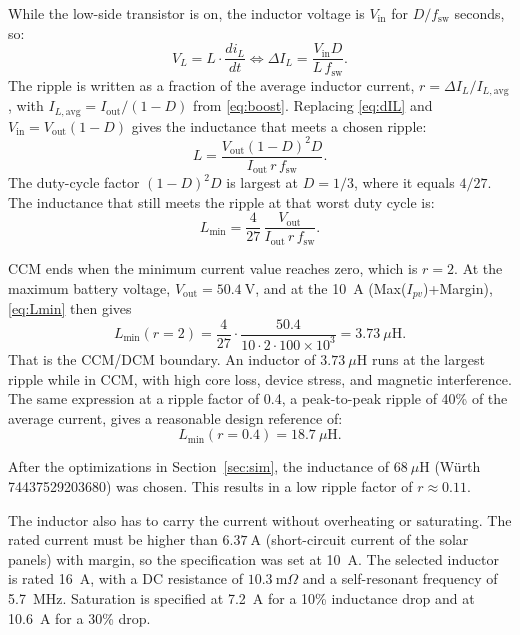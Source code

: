 \documentclass[conference]{IEEEtran}
\begin{document}
    While the low-side transistor is on, the inductor voltage is $V_{\mathrm{in}}$ for $D/f_{\mathrm{sw}}$ seconds, so:
    \begin{equation}
         V_L = L \cdot \frac{di_L}{dt} \Leftrightarrow \Delta I_L = \frac{V_{\mathrm{in}} D}{L\, f_{\mathrm{sw}}}.
        \label{eq:dIL}
    \end{equation}
    The ripple is written as a fraction of the average inductor current, $r = \Delta I_L / I_{L,\mathrm{avg}}$, with $I_{L,\mathrm{avg}} = I_{\mathrm{out}}/(1-D)$ from \eqref{eq:boost}. Replacing \eqref{eq:dIL} and $V_{\mathrm{in}} = V_{\mathrm{out}}(1-D)$ gives the inductance that meets a chosen ripple:
    \begin{equation}
        L = \frac{V_{\mathrm{out}}(1-D)^{2} D}{I_{\mathrm{out}}\, r\, f_{\mathrm{sw}}}.
        \label{eq:L}
    \end{equation}
    The duty-cycle factor $(1-D)^{2}D$ is largest at $D = 1/3$, where it equals $4/27$. The inductance that still meets the ripple at that worst duty cycle is:
    \begin{equation}
        L_{\min} = \frac{4}{27}\,\frac{V_{\mathrm{out}}}{I_{\mathrm{out}}\, r\, f_{\mathrm{sw}}}.
        \label{eq:Lmin}
    \end{equation}

    CCM ends when the minimum current value reaches zero, which is $r = 2$. At the maximum battery voltage, $V_{\mathrm{out}} = 50.4~\mathrm{V}$, and at the 10~A (Max($I_{pv}$)+Margin), \eqref{eq:Lmin} then gives
    \begin{equation}
        L_{\min}(r=2) = \frac{4}{27}\cdot\frac{50.4}{10\cdot 2\cdot 100\times 10^{3}} = 3.73~\mu\mathrm{H}.
    \end{equation}
    That is the CCM/DCM boundary. An inductor of $3.73~\mu\mathrm{H}$ runs at the largest ripple while in CCM, with high core loss, device stress, and magnetic interference. The same expression at a ripple factor of 0.4, a peak-to-peak ripple of 40\% of the average current, gives a reasonable design reference of:
    \begin{equation}
        L_{\min}(r=0.4) = 18.7~\mu\mathrm{H}.
    \end{equation}
    
    After the optimizations in Section~\ref{sec:sim}, the inductance of $68~\mu\mathrm{H}$ (Würth 74437529203680) was chosen. This results in a low ripple factor of $r \approx 0.11$.

    The inductor also has to carry the current without overheating or saturating. The rated current must be higher than $6.37~\mathrm{A}$ (short-circuit current of the solar panels) with margin, so the specification was set at 10~A. The selected inductor is rated 16~A, with a DC resistance of $10.3~\mathrm{m}\Omega$ and a self-resonant frequency of 5.7~MHz. Saturation is specified at 7.2~A for a 10\% inductance drop and at 10.6~A for a 30\% drop. 
    
\end{document}
